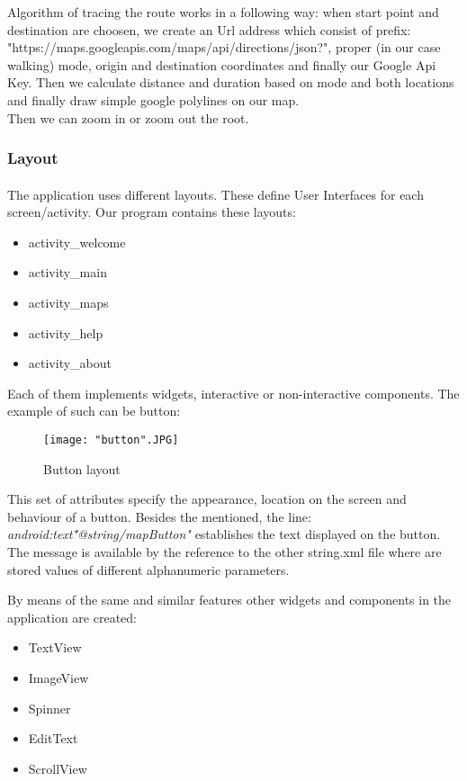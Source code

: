 \documentclass[12pt]{article}
\begin{document}
Algorithm of tracing the route works in a following way: when start point and destination are choosen, we create an Url address which consist of prefix: "https://maps.googleapis.com/maps/api/directions/json?", proper (in our case walking) mode, origin and destination coordinates and finally our Google Api Key. Then we calculate distance and duration based on mode and both locations and finally draw simple google polylines on our map.\\
Then we can zoom in or zoom out the root.

\subsubsection{Layout}
\paragraph{}
The application uses different layouts. These define User Interfaces for each screen/activity.
Our program contains these layouts:
\begin{itemize}
	\item activity\_welcome
	\item activity\_main
	\item activity\_maps
	\item activity\_help
	\item activity\_about
\end{itemize}

Each of them implements widgets, interactive or non-interactive components. The example of such can be button:

\begin{figure}[H]
\centerline{\texttt{[image: "button".JPG]}}
\caption{Button layout}
\label{fig:button}
\end{figure}

This set of attributes specify the appearance, location on the screen and behaviour of a button. Besides the mentioned, the line: \textit{android:text\="@string/mapButton"} establishes the text displayed on the button. The message is available by the reference to the other string.xml file where are stored values of different alphanumeric parameters.

By means of the same and similar features other widgets and components in the application are created:
\begin{itemize}
	\item TextView
	\item ImageView
	\item Spinner
	\item EditText
	\item ScrollView
\end{itemize}
\cleardoublepage
\end{document}
